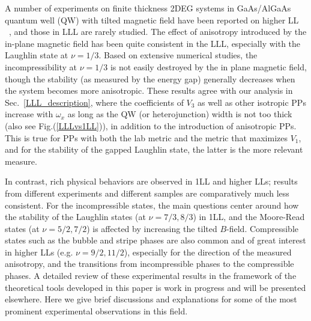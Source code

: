 \documentclass[twocolumn,showpacs,amsmath,amstex,amssymb,mathfonts,prb]{revtex4-1}
\begin{document}
A number of experiments on finite thickness 2DEG systems in GaAs/AlGaAs quantum well (QW) with tilted magnetic field have been reported on higher LL ~\cite{lilly99, du99}, and those in LLL are rarely studied. The effect of anisotropy introduced by the in-plane magnetic field has been quite consistent in the LLL, especially with the Laughlin state at $\nu = 1/3$. Based on extensive numerical studies\cite{yang1,zlatko}, the incompressibility at $\nu=1/3$ is not easily destroyed by the in plane magnetic field, though the stability (as measured by the energy gap) generally decreases when the system becomes more anisotropic. These results agree with our analysis in Sec.~\ref{LLL_description}, where the coefficients of $V_3$ as well as other isotropic PPs increase with $\omega_x$ as long as the QW (or heterojunction) width is not too thick (also see Fig.(\ref{LLLvs1LL})), in addition to the introduction of anisotropic PPs. This is true for PPs with both the lab metric and the metric that maximizes $V_1$, and for the stability of the gapped Laughlin state, the latter is the more relevant measure.

In contrast, rich physical behaviors are observed in 1LL and higher LLs; results from different experiments and different samples are comparatively much less consistent. For the incompressible states, the main questions center around how the stability of the Laughlin states (at $\nu=7/3,8/3$) in 1LL, and the Moore-Read states (at $\nu=5/2,7/2$) is affected by increasing the tilted $B$-field. Compressible states such as the bubble and stripe phases are also common and of great interest in higher LLs (e.g. $\nu=9/2, 11/2$), especially for the direction of the measured anisotropy, and the transitions from incompressible phases to the compressible phases. A detailed review of these experimental results in the framework of the theoretical tools developed in this paper is work in progress and will be presented elsewhere. Here we give brief discussions and explanations for some of the most prominent experimental observations in this field.
\end{document}
